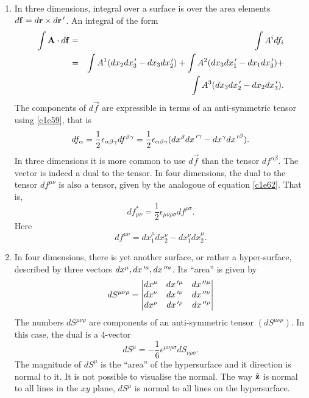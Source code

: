 \begin{enumerate}
\begin{enumerate}
\item In three dimensions, integral over a surface is over the area elements 
$d\mathbf{f} = d\mathbf{r} \times d\mathbf{r}^{\,\prime}$. An integral of the form
\begin{eqnarray*}
\int \mathbf{A}\cdot d\mathbf{f} &=& \int A^i df_i \\
 &=& \int A^1(dx_2dx_3^{\,\prime} - dx_3dx_2^{\,\prime}) + 
     \int A^2(dx_3dx_1^{\,\prime} - dx_1dx_3^{\,\prime}) + \\
 & & \int A^3(dx_3dx_2^{\,\prime} - dx_2dx_3^{\,\prime}).
\end{eqnarray*}
The components of $d\vec{f}$ are expressible in terms of an anti-symmetric 
tensor using \eqref{c1e59}, that is
\begin{equation}\label{c1e68}
df_\alpha = \frac{1}{2}\epsilon_{\alpha\beta\gamma}df^{\beta\gamma} = 
\frac{1}{2}\epsilon_{\alpha\beta\gamma}(dx^\beta d{x^{\,\prime}}^\gamma - 
dx^\gamma d{x^{\,\prime}}^\beta).
\end{equation}
In three dimensions it is more common to use $d\vec{f}$ than the tensor 
$df^{\alpha\beta}$.  The vector is indeed a dual to the tensor. In four 
dimensions, the dual to the tensor $df^{\mu\nu}$ is also a tensor, given by the 
analogoue of equation \eqref{c1e62}. 
That is,
\begin{equation}\label{c1e69}
df^\ast_{\mu\nu} = \frac{1}{2}\epsilon_{\mu\nu\rho\sigma}df^{\rho\sigma}.
\end{equation}
Here
\begin{equation}\label{c1e70}
df^{\mu\nu} = dx_1^\mu dx_2^\nu - dx_1^\nu dx_2^\mu.
\end{equation}

\item In four dimensions, there is yet another surface, or rather a 
hyper-surface, described by three vectors $dx^\mu, dx^{{\,\prime} a}, dx^{{\,\prime\prime} a}$. Its 
``area'' is given by
\begin{equation}\label{c1e71}
dS^{\mu\nu\rho} = \begin{vmatrix}
dx^\mu & dx^{{\,\prime} \mu} & dx^{{\,\prime\prime} \mu} \\
dx^\nu & dx^{{\,\prime} \nu} & dx^{{\,\prime\prime} \nu} \\
dx^\rho & dx^{{\,\prime} \rho} & dx^{{\,\prime\prime} \rho}
\end{vmatrix}
\end{equation}
The numbers $dS^{\mu\nu\rho}$ are components of an anti-symmetric tensor 
$(dS^{\mu\nu\rho})$. In this case, the dual is a 4-vector
\begin{equation}\label{c1e72}
dS^\mu = -\frac{1}{6}\epsilon^{\mu\nu\rho\sigma}dS_{\nu\rho\sigma}.
\end{equation}
The magnitude of $dS^\mu$ is the ``area'' of the hypersurface and it direction
is normal to it. It is not possible to visualise the normal. The way $\hat{\mathbf{z}}$ is
normal to all lines in the $xy$ plane, $dS^\mu$ is normal to all lines on the
hypersurface.


\end{enumerate}
\end{enumerate}
